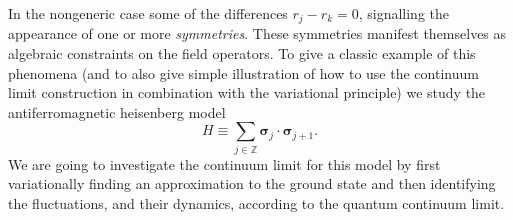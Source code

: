 \documentclass[prl,twocolumn,lengthcheck,superscriptaddress]{revtex4-1}
\theoremstyle{definition}
\theoremstyle{remark}
\begin{document}
In the nongeneric case some of the differences $r_j-r_k = 0$, signalling the appearance of one or more \emph{symmetries}. These symmetries manifest themselves as algebraic constraints on the field operators. To give a classic example of this phenomena (and to also give simple illustration of how to use the continuum limit construction in combination with the variational principle) we study the antiferromagnetic heisenberg model
\begin{equation}
	H \equiv \sum_{j\in \mathbb{Z}} \boldsymbol{\sigma}_{j}\cdot \boldsymbol{\sigma}_{j+1}.
\end{equation}
We are going to investigate the continuum limit for this model by first variationally finding an approximation to the ground state and then identifying the fluctuations, and their dynamics, according to the quantum continuum limit. 
\end{document}
